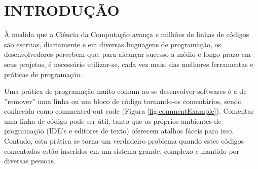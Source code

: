 \documentclass{abnt}
\begin{document}








 


\folhaderosto 








\chapter{INTRODUÇÃO}


À medida que a Ciência da Computação avança e milhões de linhas de códigos são 
escritas, diariamente e em diversas linguagens de programação, os desenvolvedores 
percebem que, para alcançar sucesso a médio e longo prazo em seus projetos, é
necessário utilizar-se, cada vez mais, das melhores ferramentas e práticas de 
programação. 

Uma prática de programação muito comum ao se desenvolver softwares é a de 
''remover'' uma linha ou um bloco de código tornando-os comentários, sendo conhecida  
como commented-out code (Figura \ref{fig:commentExample}). Comentar uma linha de código pode ser útil, tanto que 
os próprios ambientes de programação (IDE's e editores de texto) oferecem atalhos 
fáceis para isso. Contudo, esta prática se torna um verdadeiro problema quando 
estes códigos comentados estão inseridos em um sistema grande, complexo e
mantido por diversas pessoas.
\end{document}
